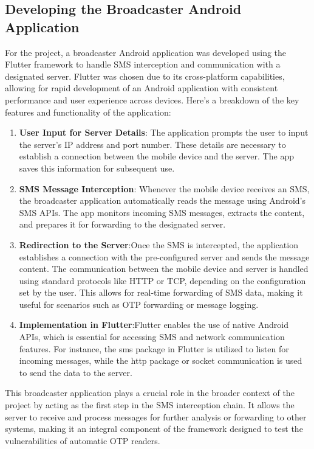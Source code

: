 \documentclass[a4paper,12pt]{article}
\begin{document}
\subsection{Developing the Broadcaster Android Application}
For the project, a broadcaster Android application was developed using the Flutter framework to handle SMS interception and communication with a designated server. Flutter was chosen due to its cross-platform capabilities, allowing for rapid development of an Android application with consistent performance and user experience across devices. Here's a breakdown of the key features and functionality of the application:
\begin{enumerate}
    \item \textbf{User Input for Server Details}: The application prompts the user to input the server's IP address and port number. These details are necessary to establish a connection between the mobile device and the server. The app saves this information for subsequent use.
    \item \textbf{SMS Message Interception}: Whenever the mobile device receives an SMS, the broadcaster application automatically reads the message using Android's SMS APIs. The app monitors incoming SMS messages, extracts the content, and prepares it for forwarding to the designated server.
    \item \textbf{Redirection to the Server}:Once the SMS is intercepted, the application establishes a connection with the pre-configured server and sends the message content. The communication between the mobile device and server is handled using standard protocols like HTTP or TCP, depending on the configuration set by the user. This allows for real-time forwarding of SMS data, making it useful for scenarios such as OTP forwarding or message logging.
    \item \textbf{Implementation in Flutter}:Flutter enables the use of native Android APIs, which is essential for accessing SMS and network communication features. For instance, the sms package in Flutter is utilized to listen for incoming messages, while the http package or socket communication is used to send the data to the server.
\end{enumerate}
This broadcaster application plays a crucial role in the broader context of the project by acting as the first step in the SMS interception chain. It allows the server to receive and process messages for further analysis or forwarding to other systems, making it an integral component of the framework designed to test the vulnerabilities of automatic OTP readers.
\end{document}
